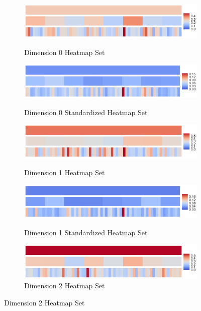 \documentclass[12pt]{article}
\begin{document}
\begin{figure}[htp!]
  \centering
  \begin{subfigure}{.45\textwidth}
    \centering
    \caption{Dimension 0 Heatmap Set}
    \includegraphics[width=\linewidth]{hmap_dim0_nonorm.pdf}
    \label{fig:cubeHeatmap0}
  \end{subfigure}
  \begin{subfigure}{.45\textwidth}
    \centering
    \caption{Dimension 0 Standardized Heatmap Set}
    \includegraphics[width=\linewidth]{hmap_dim0_yesnorm.pdf}
    \label{fig:cubeHeatmapStand0}
  \end{subfigure}
  \begin{subfigure}{.45\textwidth}
    \centering
    \caption{Dimension 1 Heatmap Set}
    \includegraphics[width=\linewidth]{hmap_dim1_nonorm.pdf}
    \label{fig:cubeHeatmap1}
  \end{subfigure}
  \begin{subfigure}{.45\textwidth}
    \centering
    \caption{Dimension 1 Standardized Heatmap Set}
    \includegraphics[width=\linewidth]{hmap_dim1_yesnorm.pdf}
    \label{fig:cubeHeatmapStand1}
  \end{subfigure}
  \begin{subfigure}{.45\textwidth}
    \centering
    \caption{Dimension 2 Heatmap Set}
    \includegraphics[width=\linewidth]{hmap_dim2_nonorm.pdf}

\end{subfigure}
\end{figure}
\end{document}
